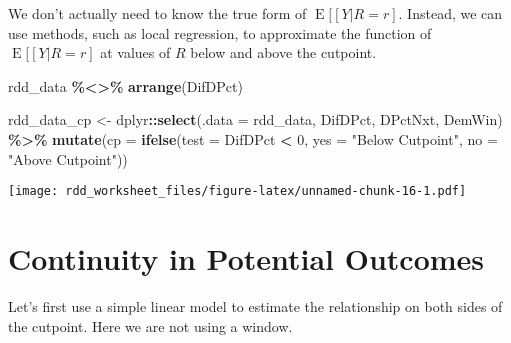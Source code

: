 \documentclass[
  12pt,
  leqno]{article}
\newenvironment{Shaded}{\begin{snugshade}}{\end{snugshade}}
\newcommand{\AttributeTok}[1]{\textcolor[rgb]{0.13,0.29,0.53}{#1}}
\newcommand{\DecValTok}[1]{\textcolor[rgb]{0.00,0.00,0.81}{#1}}
\newcommand{\FunctionTok}[1]{\textcolor[rgb]{0.13,0.29,0.53}{\textbf{#1}}}
\newcommand{\NormalTok}[1]{#1}
\newcommand{\OtherTok}[1]{\textcolor[rgb]{0.56,0.35,0.01}{#1}}
\newcommand{\SpecialCharTok}[1]{\textcolor[rgb]{0.81,0.36,0.00}{\textbf{#1}}}
\newcommand{\StringTok}[1]{\textcolor[rgb]{0.31,0.60,0.02}{#1}}
\DeclareMathOperator{\E}{\mathrm{E}}
\begin{document}
\normalsize

We don't actually need to know the true form of
\(\E[\left[Y | R =r\right]\). Instead, we can use methods, such as local
regression, to approximate the function of \(\E[\left[Y | R = r\right]\)
at values of \(R\) below and above the cutpoint.

\scriptsize

\begin{Shaded}
\begin{Highlighting}[]
\NormalTok{rdd\_data }\SpecialCharTok{\%\textless{}\textgreater{}\%}
    \FunctionTok{arrange}\NormalTok{(DifDPct)}

\NormalTok{rdd\_data\_cp }\OtherTok{\textless{}{-}}\NormalTok{ dplyr}\SpecialCharTok{::}\FunctionTok{select}\NormalTok{(}\AttributeTok{.data =}\NormalTok{ rdd\_data, DifDPct, DPctNxt, DemWin) }\SpecialCharTok{\%\textgreater{}\%}
    \FunctionTok{mutate}\NormalTok{(}\AttributeTok{cp =} \FunctionTok{ifelse}\NormalTok{(}\AttributeTok{test =}\NormalTok{ DifDPct }\SpecialCharTok{\textless{}} \DecValTok{0}\NormalTok{, }\AttributeTok{yes =} \StringTok{"Below Cutpoint"}\NormalTok{, }\AttributeTok{no =} \StringTok{"Above Cutpoint"}\NormalTok{))}
\end{Highlighting}
\end{Shaded}

\normalsize

\scriptsize

\texttt{[image: rdd\_worksheet\_files/figure-latex/unnamed-chunk-16-1.pdf]}
\normalsize

\section{Continuity in Potential Outcomes}

Let's first use a simple linear model to estimate the relationship on
both sides of the cutpoint. Here we are not using a window.

\scriptsize
\end{document}
